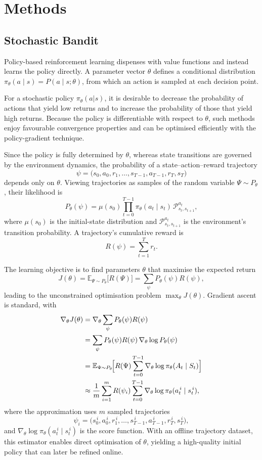 \section{Methods} \label{sec:3_methods}

\subsection{Stochastic Bandit}\label{sec:stochastic_bandit_method}
Policy-based reinforcement learning dispenses with value functions and instead learns the policy directly.  
A parameter vector $\theta$ defines a conditional distribution $\pi_{\theta}(a\mid s)=P(a\mid s;\theta)$, from which an action is sampled at each decision point.  

For a stochastic policy $\pi_{\theta}(a|s)$, it is desirable to decrease the probability of actions that yield low returns and to increase the probability of those that yield high returns. Because the policy is differentiable with respect to $\theta$, such methods enjoy favourable convergence properties and can be optimised efficiently with the policy-gradient technique.

Since the policy is fully determined by $\theta$, whereas state transitions are governed by the environment dynamics,  
the probability of a state–action–reward trajectory
\[\psi=\bigl(s_0,a_0,r_1,\dots,s_{T-1},a_{T-1},r_T,s_T\bigr)\]
depends only on $\theta$. Viewing trajectories as samples of the random variable $\Psi\sim P_{\theta}$, their likelihood is
\[
P_{\theta}(\psi)=\mu(s_0)\prod_{t=0}^{T-1}
\pi_{\theta}(a_t\mid s_t)\,\mathcal{P}^{a_t}_{s_t,s_{t+1}},
\]
where $\mu(s_0)$ is the initial-state distribution and $\mathcal{P}^{a_t}_{s_t,s_{t+1}}$ is the environment’s transition probability. A trajectory’s cumulative reward is
\[
R(\psi)=\sum_{t=1}^{T} r_t.
\]

The learning objective is to find parameters $\theta$ that maximise the expected return
\[
J(\theta)=
\mathbb{E}_{\Psi\sim P_{\theta}}\!\bigl[R(\Psi)\bigr]
=\sum_{\psi}P_{\theta}(\psi)R(\psi),
\]
leading to the unconstrained optimisation problem $\max_{\theta}J(\theta)$.  
Gradient ascent is standard, with
\[
\begin{aligned}
\nabla_{\theta}J(\theta)
&= \nabla_{\theta}\sum_{\psi}P_{\theta}(\psi)R(\psi)\\
&= \sum_{\psi}P_{\theta}(\psi)R(\psi)\,\nabla_{\theta}\log P_{\theta}(\psi)\\
&= \mathbb{E}_{\Psi\sim P_{\theta}}\!\Bigl[
  R(\Psi)\sum_{t=0}^{T-1}\nabla_{\theta}\log\pi_{\theta}(A_t\mid S_t)
\Bigr]\\
&\approx \frac{1}{m}\sum_{i=1}^{m}
  R(\psi_i)\sum_{t=0}^{T-1}
  \nabla_{\theta}\log\pi_{\theta}(a_t^{\,i}\mid s_t^{\,i}),
\end{aligned}
\]
where the approximation uses $m$ sampled trajectories
\[
\psi_i=\bigl(s_0^{\,i},a_0^{\,i},r_1^{\,i},\dots,
            s_{T-1}^{\,i},a_{T-1}^{\,i},r_T^{\,i},s_T^{\,i}\bigr),
\]
and $\nabla_{\theta}\log\pi_{\theta}(a_t^{\,i}\mid s_t^{\,i})$ is the score function.  
With an offline trajectory dataset, this estimator enables direct optimisation of $\theta$, yielding a high-quality initial policy that can later be refined online.


